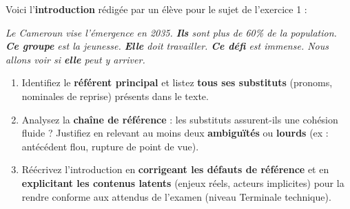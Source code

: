 \documentclass[11pt]{article}
\begin{document}
\begin{exercice}
\noindent Voici l'\textbf{introduction} rédigée par un élève pour le sujet de l'exercice 1 :

\og \textit{Le Cameroun vise l'émergence en 2035. \textbf{Ils} sont plus de 60\% de la population. \textbf{Ce groupe} est la jeunesse. \textbf{Elle} doit travailler. \textbf{Ce défi} est immense. Nous allons voir si \textbf{elle} peut y arriver.}\fg

\begin{enumerate}
    \item Identifiez le \textbf{référent principal} et listez \textbf{tous ses substituts} (pronoms, nominales de reprise) présents dans le texte.
    \item Analysez la \textbf{chaîne de référence} : les substituts assurent-ils une cohésion fluide ? Justifiez en relevant au moins deux \textbf{ambiguïtés} ou \textbf{lourds} (ex : antécédent flou, rupture de point de vue).
    \item Réécrivez l'introduction en \textbf{corrigeant les défauts de référence} et en \textbf{explicitant les contenus latents} (enjeux réels, acteurs implicites) pour la rendre conforme aux attendus de l'examen (niveau Terminale technique).
\end{enumerate}
\end{exercice}
\end{document}
